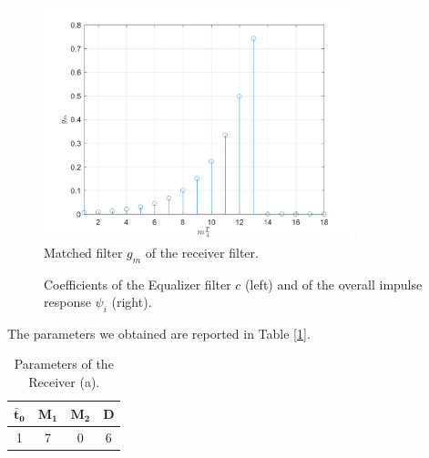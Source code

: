 \documentclass[a4paper, 12pt]{report}
\begin{document}
\begin{figure}[H]
	\centering
	\includegraphics[width=9cm]{images/RecA_gm}
	\caption{Matched filter $g_m$ of the receiver filter.}\label{gm_a}
\end{figure}

\begin{figure}[H]
	\centering
	\caption{Coefficients of the Equalizer filter $c$ (left) and of the overall impulse response $\psi_i$ (right).}\label{filters_a}
\end{figure}

The parameters we obtained are reported in Table [\ref{Tab_a}].

\begin{table}[H]
	\centering
	\begin{tabular}{c c c c}
		\toprule
		$\mathbf{\bar{t}_0}$ & $\mathbf{M_1}$ & $\mathbf{M_2}$ & \textbf{D}     \\
		\midrule
		1 & 7 & 0 & 6 \\
		\bottomrule			
	\end{tabular}
	\caption{Parameters of the Receiver (a).}
	\label{Tab_a}
\end{table}
\end{document}
